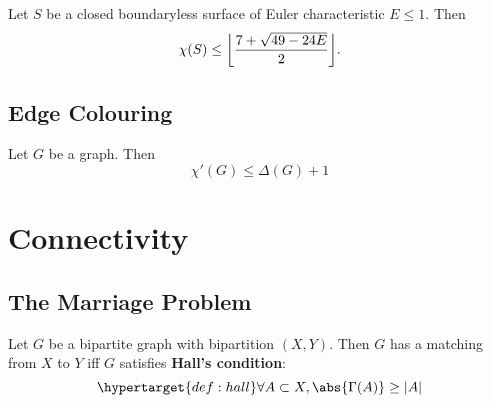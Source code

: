 \documentclass{article}
\DeclarePairedDelimiter\floor{\lfloor}{\rfloor}
\begin{document}
\begin{nthm}\label{thm:29}
    Let $S$ be a closed boundaryless surface of Euler characteristic $E \leq 1$. Then
    \begin{equation*}
        \chi(S) \leq \floor*{\frac{7 + \sqrt{49-24E}}{2}}.
    \end{equation*}
\end{nthm}





























\subsection{Edge Colouring}




\begin{nthm}\label{thm:30}
    Let $G$ be a graph. Then
    \begin{equation*}
        \chi'(G) \leq \Delta(G) + 1
    \end{equation*}
\end{nthm}

\clearpage
\section{Connectivity}
\subsection{The Marriage Problem}















\begin{nthm}\label{thm:31}
    Let $G$ be a bipartite graph with bipartition $(X,Y)$.
    Then $G$ has a matching from $X$ to $Y$ iff $G$ satisfies \textbf{Hall's condition}:
    \begin{equation*}
        \hypertarget{def:hall}\forall A \subset X, \abs{\Gamma(A)} \geq |A|
    \end{equation*}
\end{nthm}
\end{document}
